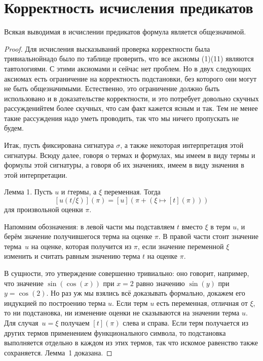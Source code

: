 \section{Корректность исчисления предикатов}%
%
%
        \label{predicate-correctness}

\begin{theorem}
Всякая выводимая в исчислении предикатов формула является общезначимой.
\end{theorem}

\begin{proof}
Для исчисления высказываний проверка корректности была
тривиальной\т надо было по таблице проверить, что все аксиомы
(1)\ч (11) являются тавтологиями. С этими аксиомами и сейчас нет
проблем. Но в двух следующих аксиомах есть ограничение на
корректность подстановки,%
без которого они могут не быть
общезначимыми. Естественно, это ограничение должно быть
использовано и в доказательстве корректности, и это потребует
довольно скучных рассуждений\т тем более скучных, что сам факт
кажется ясным и так. Тем не менее такие рассуждения надо уметь
проводить, так что мы ничего пропускать не будем.

Итак, пусть фиксирована сигнатура $\sigma$, а также некоторая
интерпретация этой сигнатуры. Всюду далее, говоря о термах и
формулах, мы имеем в виду термы и формулы этой сигнатуры, а
говоря об их значениях, имеем в виду значения в этой
интерпретации.

\textsf{Лемма 1}. Пусть $u$ и $t$\т термы, а $\xi$\т
переменная. Тогда
        $$
   [u (t/\xi)](\pi) = [u](\pi + (\xi\mapsto [t](\pi)))
        $$
для произвольной оценки $\pi$.

Напомним обозначения: в левой части мы подставляем $t$ вместо $\xi$
в терм $u$, и берём значение получившегося терма на оценке $\pi$.
В правой части стоит значение терма~$u$ на оценке, которая получится
из $\pi$, если значение переменной $\xi$ изменить и считать равным
значению терма $t$ на оценке $\pi$.

В сущности, это утверждение совершенно тривиально: оно говорит,
например, что значение $\sin(\cos(x))$ при $x=2$ равно значению
$\sin(y)$ при $y=\cos(2)$. Но раз уж мы взялись всё доказывать
формально, докажем его индукцией по построению терма $u$. Если
терм $u$ есть переменная, отличная от $\xi$, то ни подстановка,
ни изменение оценки не сказываются на значении терма $u$. Для
случая~$u=\xi$ получаем $[t](\pi)$ слева и справа. Если терм
получается из других термов применением функционального символа,
то подстановка выполняется отдельно в каждом из этих термов, так
что искомое равенство также сохраняется. Лемма~1 доказана.


\end{proof}
